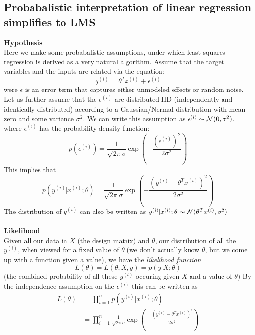 \documentclass{report}
\begin{document}
\subsection{Probabalistic interpretation of linear regression simplifies to LMS}
\textbf{Hypothesis}\\
Here we make some probabalistic assumptions, under which least-squares regression is derived as a very natural
algorithm. Assume that the target variables and the inputs are related via the equation:
\begin{equation*}
y^{(i)}=\theta^Tx^{(i)}+\epsilon^{(i)}
\end{equation*}
were $\epsilon$ is an error term that captures either unmodeled effects or random noise. 
Let us further assume that the $\epsilon^{(i)}$ are distributed IID (independently and identically distributed)
according to a Gaussian/Normal distribution with mean zero and some variance $\sigma^2$. We can write this
assumption as $\epsilon^{(i)}\thicksim\mathcal{N}(0,\sigma^2)$, where $\epsilon^{(i)}$ has the probability density
function:
\begin{equation*}
p(\epsilon^{(i)})=\frac{1}{\sqrt{2\pi}\sigma}\exp\left(-\frac{(\epsilon^{(i)})^2}{2\sigma^2}\right)
\end{equation*}
This implies that
\begin{equation*}
p(y^{(i)}|x^{(i)};\theta)=\frac{1}{\sqrt{2\pi}\sigma}\exp\left(-\frac{(y^{(i)}-\theta^Tx^{(i)})^2}{2\sigma^2}\right)
\end{equation*}
The distribution of $y^{(i)}$ can also be written as 
$y^{(i)}|x^{(i)};\theta\thicksim\mathcal{N}(\theta^Tx^{(i)},\sigma^2)$\\
\vspace{1mm}\\
\textbf{Likelihood}\\
Given all our data in $X$ (the design matrix) and $\theta$, our distribution of all the $y^{(i)}$, when viewed
for a fixed value of $\theta$ (we don't actually know $\theta$, but we come up with a function given a value), we
have the \textit{likelihood function}
\begin{equation*}
L(\theta)=L(\theta;X,y)=p(y|X;\theta)
\end{equation*}
(the combined probability of all these $y^{(i)}$ occuring given $X$ and a value of $\theta$) By the independence
assumption on the $\epsilon^{(i)}$ this can be written as
\begin{align*}
L(\theta)&=\prod^n_{i=1}p(y^{(i)}|x^{(i)};\theta)\\
&=\prod^n_{i=1}\frac{1}{\sqrt{2\pi}\sigma}\exp\left(-\frac{(y^{(i)}-\theta^Tx^{(i)})^2}{2\sigma^2}\right)
\end{align*}
\end{document}
